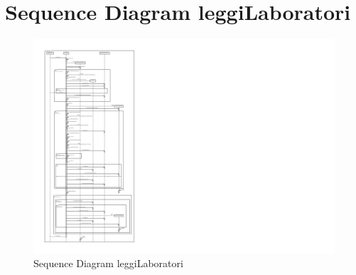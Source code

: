     \section{Sequence Diagram leggiLaboratori}
        \begin{figure}[htbp!]
            \centering
                \vspace{2\baselineskip}
                \includegraphics[width=1.7\linewidth]{Immagini/Diagrammi/Sequence Diagram/Sequence Diagram leggiLaboratori.pdf}
            \caption{Sequence Diagram leggiLaboratori}
            \label{fig:Sequence Diagram leggiLaboratori}
        \end{figure}